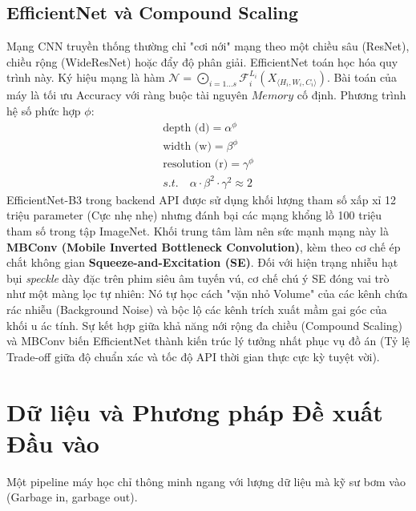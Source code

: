 \documentclass[conference,a4paper]{IEEEtran}
\begin{document}
\subsection{EfficientNet và Compound Scaling}
Mạng CNN truyền thống thường chỉ "cơi nới" mạng theo một chiều sâu (ResNet), chiều rộng (WideResNet) hoặc đẩy độ phân giải. EfficientNet \cite{efficientnet} toán học hóa quy trình này. Ký hiệu mạng là hàm $\mathcal{N} = \bigodot_{i=1...s} \mathcal{F}_i^{L_i} (X_{\langle H_i, W_i, C_i \rangle})$. Bài toán của máy là tối ưu Accuracy với ràng buộc tài nguyên $Memory$ cố định. Phương trình hệ số phức hợp $\phi$:
\begin{eqnarray}
\text{depth (d)} = \alpha^\phi \\
\text{width (w)} = \beta^\phi \\
\text{resolution (r)} = \gamma^\phi \\
s.t. \quad \alpha \cdot \beta^2 \cdot \gamma^2 \approx 2
\end{eqnarray}
EfficientNet-B3 trong backend API được sử dụng khối lượng tham số xấp xỉ 12 triệu parameter (Cực nhẹ nhẹ) nhưng đánh bại các mạng khổng lồ 100 triệu tham số trong tập ImageNet. Khối trung tâm làm nên sức mạnh mạng này là \textbf{MBConv (Mobile Inverted Bottleneck Convolution)}, kèm theo cơ chế ép chắt không gian \textbf{Squeeze-and-Excitation (SE)}. Đối với hiện trạng nhiễu hạt bụi \textit{speckle} dày đặc trên phim siêu âm tuyến vú, cơ chế chú ý SE đóng vai trò như một màng lọc tự nhiên: Nó tự học cách "vặn nhỏ Volume" của các kênh chứa rác nhiễu (Background Noise) và bộc lộ các kênh trích xuất mầm gai góc của khối u ác tính. Sự kết hợp giữa khả năng nới rộng đa chiều (Compound Scaling) và MBConv biến EfficientNet thành kiến trúc lý tưởng nhất phục vụ đồ án (Tỷ lệ Trade-off giữa độ chuẩn xác và tốc độ API thời gian thực cực kỳ tuyệt vời).

\section{Dữ liệu và Phương pháp Đề xuất Đầu vào}
Một pipeline máy học chỉ thông minh ngang với lượng dữ liệu mà kỹ sư bơm vào (Garbage in, garbage out).
\end{document}
